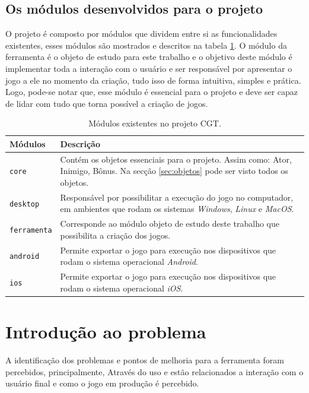 \documentclass[12pt,twoside,openright,a4paper,english,brazil,sumario=tradicional]{abntex2}
\begin{document}
\subsection{Os módulos desenvolvidos para o projeto}
O projeto é composto por módulos que dividem entre si as funcionalidades existentes, esses módulos são mostrados e descritos na tabela \ref{table:modulos}. O módulo da ferramenta é o objeto de estudo para este trabalho e o objetivo deste módulo é implementar toda a interação com o usuário e ser responsável por apresentar o jogo a ele no momento da criação, tudo isso de forma intuitiva, simples e prática. Logo, pode-se notar que, esse módulo é essencial para o projeto e deve ser capaz de lidar com tudo que torna possível a criação de jogos.
\begin{table}[h]
   \centering
   \begin{tabular}{ | l | p{10cm} | }
      \hline
      \textbf{Módulos} & \textbf{Descrição} \\
      \hline
      \texttt{core} & Contém os objetos essenciais para o projeto. Assim como: Ator, Inimigo, Bônus. Na secção \ref{sec:objetos} pode ser visto todos os objetos. \\
      \hline
      \texttt{desktop} & Responsável por possibilitar a execução do jogo no computador, em ambientes que rodam os sistemas \emph{Windows}, \emph{Linux} e \emph{MacOS}. \\
      \hline
      \texttt{ferramenta} & Corresponde ao módulo objeto de estudo deste trabalho que possibilita a criação dos jogos. \\
      \hline
      \texttt{android} & Permite exportar o jogo para execução nos dispositivos que rodam o sistema operacional \emph{Android}. \\
      \hline
      \texttt{ios} & Permite exportar o jogo para execução nos dispositivos que rodam o sistema operacional \emph{iOS}. \\
      \hline
   \end{tabular}
   \caption{Módulos existentes no projeto CGT.}
   \label{table:modulos}
\end{table}
\section{Introdução ao problema}
\label{sec:intro-problema}
A identificação dos problemas e pontos de melhoria para a ferramenta foram percebidos, principalmente, Através do uso e estão relacionados a interação com o usuário final e como o jogo em produção é percebido.
\end{document}

